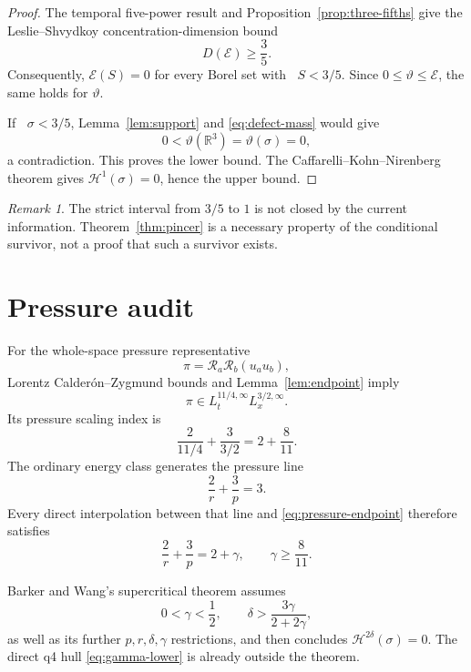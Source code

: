 \documentclass[11pt]{article}
\theoremstyle{remark}
\newtheorem{remark}[theorem]{Remark}
\newcommand{\R}{\mathbb R}
\newcommand{\HH}{\mathcal H}
\newcommand{\EE}{\mathcal E}
\DeclareMathOperator{\dimH}{dim_{\mathrm H}}
\begin{document}
\begin{proof}
The temporal five-power result and
Proposition~\ref{prop:three-fifths} give the
Leslie--Shvydkoy concentration-dimension bound
\[
 D(\EE)\geq\frac35.
\]
Consequently, \(\EE(S)=0\) for every Borel set with
\(\dimH S<3/5\).  Since \(0\leq\vartheta\leq\EE\), the same holds for
\(\vartheta\).

If \(\dimH\sigma<3/5\), Lemma~\ref{lem:support} and
\eqref{eq:defect-mass} would give
\[
 0<\vartheta(\R^3)=\vartheta(\sigma)=0,
\]
a contradiction.  This proves the lower bound.  The
Caffarelli--Kohn--Nirenberg theorem gives \(\HH^1(\sigma)=0\), hence
the upper bound.
\end{proof}

\begin{remark}
The strict interval from \(3/5\) to \(1\) is not closed by the current
information.  Theorem~\ref{thm:pincer} is a necessary property of the
conditional survivor, not a proof that such a survivor exists.
\end{remark}

\section{Pressure audit}

For the whole-space pressure representative
\[
 \pi=\mathcal R_a\mathcal R_b(u_au_b),
\]
Lorentz Calder\'on--Zygmund bounds and
Lemma~\ref{lem:endpoint} imply
\begin{equation}
 \label{eq:pressure-endpoint}
 \pi\in
 L_t^{11/4,\infty}L_x^{3/2,\infty}.
\end{equation}
Its pressure scaling index is
\begin{equation}
 \label{eq:pressure-gamma}
 \frac2{11/4}+\frac3{3/2}
 =
 2+\frac8{11}.
\end{equation}
The ordinary energy class generates the pressure line
\[
 \frac2r+\frac3p=3.
\]
Every direct interpolation between that line and
\eqref{eq:pressure-endpoint} therefore satisfies
\begin{equation}
 \label{eq:gamma-lower}
 \frac2r+\frac3p=2+\gamma,
 \qquad
 \gamma\geq\frac8{11}.
\end{equation}

Barker and Wang's supercritical theorem assumes
\[
 0<\gamma<\frac12,
 \qquad
 \delta>\frac{3\gamma}{2+2\gamma},
\]
as well as its further \(p,r,\delta,\gamma\) restrictions, and then
concludes \(\HH^{2\delta}(\sigma)=0\).  The direct q4 hull
\eqref{eq:gamma-lower} is already outside the theorem.
\end{document}
